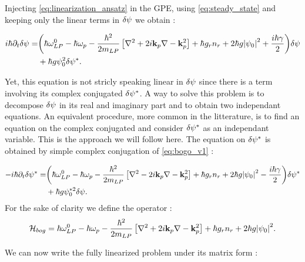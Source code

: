 \bigskip

Injecting \autoref{eq:linearization_ansatz} in the GPE, using \autoref{eq:steady_state} and keeping only the linear terms in $\delta\psi$ we obtain :

\begin{equation}
    \begin{split}
        i  \hbar \partial_t \delta\psi =& \biggl(\hbar\omega_{LP}^0 - \hbar \omega_p-\dfrac{\hbar^2}{2m_{LP}}\left[\nabla^2 +2i\mathbf{k}_p\nabla-\mathbf{k}_p^2\right]+\hbar g_rn_r + 2\hbar g \abs{\psi_0}^2+ \dfrac{i\hbar\gamma}{2} \biggr) \delta\psi \\
                                    &+ \hbar g \psi_0^2 \delta\psi^*. 
    \end{split}
    \label{eq:bogo_v1}
\end{equation}

Yet, this equation is not stricly speaking linear in $\delta\psi$ since there is a term involving its complex conjugated $\delta\psi^*$. A way to solve this problem
is to decompose $\delta\psi$ in its real and imaginary part and to obtain two independant equations. An equivalent procedure, more common in the litterature, is to find an equation on 
the complex conjugated and consider $\delta\psi^*$ as an independant variable. This is the approach we will follow here. The equation on $\delta\psi^*$ is obtained by simple complex conjugation of \autoref{eq:bogo_v1} :

\begin{equation}
    \begin{split}
    -i  \hbar \partial_t \delta\psi^* = &\biggl(\hbar\omega_{LP}^0 - \hbar \omega_p-\dfrac{\hbar^2}{2m_{LP}}\left[\nabla^2 -2i\mathbf{k}_p\nabla-\mathbf{k}_p^2\right]+\hbar g_rn_r + 2\hbar g \abs{\psi_0}^2- \dfrac{i\hbar\gamma}{2}\biggr) \delta\psi^* \\
      &+ \hbar g \psi_0^{*2} \delta\psi.
    \end{split}
    \label{eq:bogo_v2}
\end{equation}
For the sake of clarity we define the operator :
\begin{equation}
    \mathcal{H}_{bog}= \hbar\omega_{LP}^0 - \hbar \omega_p-\dfrac{\hbar^2}{2m_{LP}}\left[\nabla^2 +2i\mathbf{k}_p\nabla-\mathbf{k}_p^2\right]+\hbar g_rn_r + 2\hbar g \abs{\psi_0}^2.
    \label{eq:hambog}
\end{equation}

We can now write the fully linearized problem under its matrix form :


